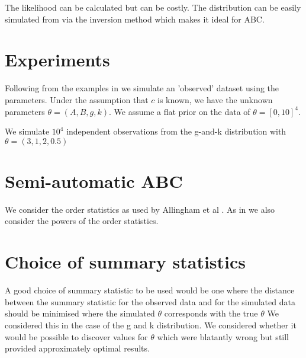 \documentclass{article} %
\begin{document}
The likelihood can be calculated but can be costly. The distribution can be easily simulated from via the inversion method which makes it ideal for ABC.

\section{Experiments}
Following from the examples in \cite{Fearnhead} we simulate an 'observed' dataset using the parameters. Under the assumption that $c$ is known, we have the unknown parameters $\theta = (A, B, g, k)$. We assume a flat prior on the data of $\theta = [0, 10]^4$.

We simulate $10^4$ independent observations from the g-and-k distribution with $\theta = (3, 1, 2, 0.5)$

\section{Semi-automatic ABC}
We consider the order statistics as used by Allingham et al \cite{Allingham}. As in \cite{Fearnhead} we also consider the powers of the order statistics.



\section{Choice of summary statistics}
A good choice of summary statistic to be used would be one where the distance between the summary statistic for the observed data and for the simulated data should be minimised where the simulated $\theta$ corresponds with the true $\theta$ We considered this in the case of the g and k distribution. We considered whether it would be possible to discover values for $\theta$ which were blatantly wrong but still provided approximately optimal results.
\end{document}
